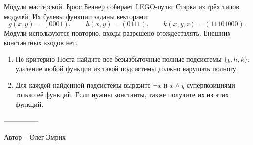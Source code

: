 \question
Модули мастерской. Брюс Беннер собирает LEGO-пульт Старка из трёх типов модулей. Их булевы функции заданы векторами:
\[
g(x,y)=(0001),\qquad h(x,y)=(0111),\qquad k(x,y,z)=(11101000).
\]
Модули используются повторно, входы разрешено отождествлять. Внешних константных входов нет.
\begin{enumerate}
\item По критерию Поста найдите все безызбыточные полные подсистемы $\{g,h,k\}$: удаление любой функции из такой подсистемы должно нарушать полноту.
\item Для каждой найденной подсистемы выразите $\neg x$ и $x\land y$ суперпозициями только её функций. Если нужны константы, также получите их из этих функций.
\end{enumerate}

---------------

Автор -- Олег Эмрих

